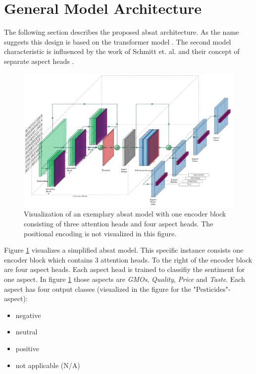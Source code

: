\section{General Model Architecture}

The following section describes the proposed \acrfull{absat} architecture. As the name suggests this design is based on the transformer model \cite{Vaswani2017}. The second model characteristic is influenced by the work of Schmitt et. al. and their concept of separate aspect heads \cite{Schmitt2018}.
\bigskip

\begin{figure}[htp]
	\centering
	\includegraphics[width=\textwidth]{figures/04_method/04_t-absa}
	\caption{Visualization of an exemplary \acrfull{absat} model with one encoder block consisting of three attention heads and four aspect heads. The positional encoding is not visualized in this figure.}
	\label{fig:04_t-absa}
\end{figure}

Figure \ref{fig:04_t-absa} visualizes a simplified \gls{absat} model. This specific instance consists one encoder block which contains 3 attention heads. To the right of the encoder block are four aspect heads. Each aspect head is trained to classifiy the sentiment for one aspect. In figure \ref{fig:04_t-absa} those aspects are \textit{GMOs}, \textit{Quality}, \textit{Price} and \textit{Taste}. Each aspect has four output classes {(visualized in the figure for the "Pesticides"-aspect)}:

\begin{itemize}
	\item negative
	\item neutral
	\item positive
	\item not applicable {(N/A)}
\end{itemize}

